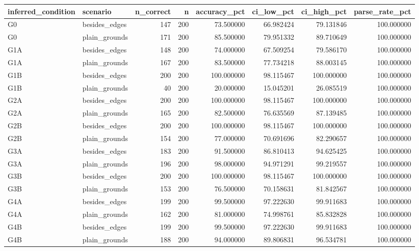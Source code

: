 \begin{tabular}{llrrrrrr}
\toprule
inferred_condition & scenario & n_correct & n & accuracy_pct & ci_low_pct & ci_high_pct & parse_rate_pct \\
\midrule
G0 & besides_edges & 147 & 200 & 73.500000 & 66.982424 & 79.131846 & 100.000000 \\
G0 & plain_grounds & 171 & 200 & 85.500000 & 79.951332 & 89.710649 & 100.000000 \\
G1A & besides_edges & 148 & 200 & 74.000000 & 67.509254 & 79.586170 & 100.000000 \\
G1A & plain_grounds & 167 & 200 & 83.500000 & 77.734218 & 88.003145 & 100.000000 \\
G1B & besides_edges & 200 & 200 & 100.000000 & 98.115467 & 100.000000 & 100.000000 \\
G1B & plain_grounds & 40 & 200 & 20.000000 & 15.045201 & 26.085519 & 100.000000 \\
G2A & besides_edges & 200 & 200 & 100.000000 & 98.115467 & 100.000000 & 100.000000 \\
G2A & plain_grounds & 165 & 200 & 82.500000 & 76.635569 & 87.139485 & 100.000000 \\
G2B & besides_edges & 200 & 200 & 100.000000 & 98.115467 & 100.000000 & 100.000000 \\
G2B & plain_grounds & 154 & 200 & 77.000000 & 70.691696 & 82.290657 & 100.000000 \\
G3A & besides_edges & 183 & 200 & 91.500000 & 86.810413 & 94.625425 & 100.000000 \\
G3A & plain_grounds & 196 & 200 & 98.000000 & 94.971291 & 99.219557 & 100.000000 \\
G3B & besides_edges & 200 & 200 & 100.000000 & 98.115467 & 100.000000 & 100.000000 \\
G3B & plain_grounds & 153 & 200 & 76.500000 & 70.158631 & 81.842567 & 100.000000 \\
G4A & besides_edges & 199 & 200 & 99.500000 & 97.222630 & 99.911683 & 100.000000 \\
G4A & plain_grounds & 162 & 200 & 81.000000 & 74.998761 & 85.832828 & 100.000000 \\
G4B & besides_edges & 199 & 200 & 99.500000 & 97.222630 & 99.911683 & 100.000000 \\
G4B & plain_grounds & 188 & 200 & 94.000000 & 89.806831 & 96.534781 & 100.000000 \\
\bottomrule
\end{tabular}
